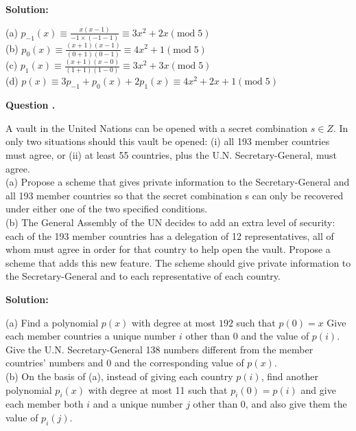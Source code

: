 \documentclass[12pt]{article}
\newcounter{questionnumber}
\newenvironment{question}[1][]{\stepcounter{questionnumber}\par\noindent\textbf{Question \thequestionnumber. #1}\par}{\par}
\newenvironment{solution}{\par\noindent\textbf{Solution:}\par}{\par\vspace{1em}}
\begin{document}
\begin{solution}
    \noindent
    (a) $p_{-1}\left( x \right) \equiv \frac{x\left( x-1 \right)}{-1\times \left( -1-1 \right)}\equiv 3x^2+2x\left( \mathrm{mod}\;5 \right) $\\
    (b) $p_0\left( x \right) \equiv \frac{\left( x+1 \right) \left( x-1 \right)}{\left( 0+1 \right) \left( 0-1 \right)}\equiv 4x^2+1\left( \mathrm{mod}\;5 \right) $\\
    (c) $p_1\left( x \right) \equiv \frac{\left( x+1 \right) \left( x-0 \right)}{\left( 1+1 \right) \left( 1-0 \right)}\equiv 3x^2+3x\left( \mathrm{mod}\;5 \right) $\\
    (d) $p\left( x \right) \equiv 3p_{-1}+p_0\left( x \right) +2p_1\left( x \right) \equiv 4x^2+2x+1\left( \mathrm{mod}\;5 \right) $
\end{solution}
\begin{question}
    A vault in the United Nations can be opened with a secret combination $s \in Z$. In only two situations should this vault be opened: (i) all 193 member countries must agree, or (ii) at least 55 countries, plus the U.N. Secretary-General, must agree.\\
    (a) Propose a scheme that gives private information to the Secretary-General and all 193 member countries so that the secret combination s can only be recovered under either one of the two specified conditions.\\
    (b) The General Assembly of the UN decides to add an extra level of security: each of the 193 member countries has a delegation of 12 representatives, all of whom must agree in order for that country to help open the vault. Propose a scheme that adds this new feature. The scheme should give private information to the Secretary-General and to each representative of each country.
\end{question}
\begin{solution}
    \noindent
    (a) Find a polynomial $p(x)$ with degree at most $192$ such that $p(0)=x$
    Give each member countries a unique number $i$ other than 0 and the value of $p(i)$.
    Give the U.N. Secretary-General 138 numbers different from the member countries' numbers and 0 and the corresponding value of $p(x)$.\\
    (b) On the basis of (a), instead of giving each country $p(i)$, find another polynomial $p_i(x)$ with degree at most 11 such that $p_i(0)=p(i)$ and give each member both $i$ and a unique number $j$ other than 0, and also give them the value of $p_i(j)$.
\end{solution}
\end{document}
